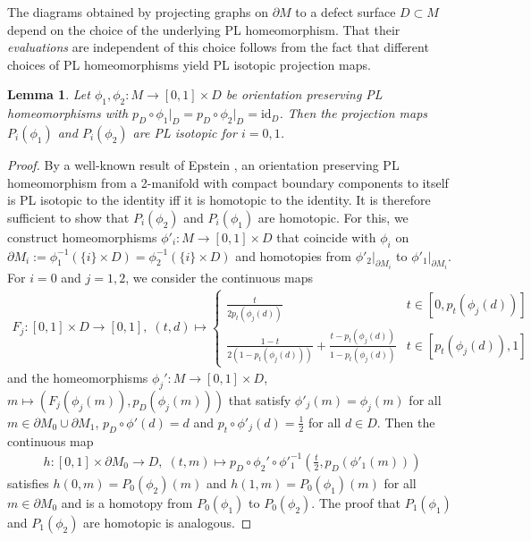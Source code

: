 \documentclass[1.5pt, a4paper]{article}
\newcommand{\inv}[0]{{-1}}
\newtheorem{lemma}[theorem]{Lemma}
\begin{document}
The diagrams obtained by projecting graphs on $\partial M$ to a defect surface $D\subset M$  depend on the choice of the underlying  PL homeomorphism. That their \emph{evaluations} are independent of this choice follows from the fact that different choices of PL homeomorphisms yield PL isotopic projection maps. 


\begin{lemma} \label{lem:projiso}Let $\phi_1,\phi_2: M\to [0,1]\times D$ be orientation preserving PL homeomorphisms with $p_D\circ \phi_1\vert_D=p_D\circ \phi_2\vert_D=\mathrm{id}_D$. Then the projection maps  $P_i(\phi_1)$ and $P_i(\phi_2)$ are PL isotopic for $i=0,1$. 
\end{lemma}

\begin{proof} By a well-known result of Epstein \cite[Th.~6.4]{E}, an orientation preserving PL homeomorphism from a 2-manifold with compact boundary components to itself is  
PL isotopic to the identity iff it is  homotopic to the identity. It is therefore sufficient to show that $P_i(\phi_2)$ and $P_i(\phi_1)$ are homotopic.  For this, we construct homeomorphisms $\phi'_i: M\to [0,1]\times D$ that coincide with $\phi_i$ on $\partial M_i:=\phi_1^\inv(\{i\}\times D)=\phi_2^\inv(\{i\}\times D)$ and  homotopies from $\phi'_2\vert_{\partial M_i}$ to $\phi'_1\vert_{\partial M_i}$.  For $i=0$ and $j=1,2$, we consider the continuous maps
\begin{align*}
F_j:[0,1]\times D\to [0,1], \;(t,d)\mapsto \begin{cases}\frac t {2 p_t(\phi_j(d))} & t\in[0, p_t(\phi_j(d))]\\
\frac {1-t}{2(1-p_t(\phi_j(d)))}+\frac {t-p_t(\phi_j(d))}{1-p_t(\phi_j(d))} & t\in[p_t(\phi_j(d)), 1]
\end{cases}
\end{align*}
and the homeomorphisms
$\phi_j': M\to [0,1]\times D$, $m\mapsto (F_j(\phi_j(m)), p_D(\phi_j(m)))$
that satisfy $\phi'_j(m)=\phi_j(m)$ for all $m\in \partial M_0\cup \partial M_1$, $p_D\circ \phi'(d)=d$ and $p_t\circ \phi'_j(d)=\tfrac 1 2$ for all $d\in D$. Then the continuous map
\begin{align*}
h:[0,1]\times \partial M_0\to D,\; (t,m)\mapsto p_D\circ \phi_2'\circ \phi'^\inv_1(\tfrac t 2 , p_D(\phi'_1(m)))
\end{align*}
satisfies $h(0,m)=P_0(\phi_2)(m)$ and $h(1,m)=P_0(\phi_1)(m)$ for all $m\in \partial M_0$ and is a homotopy from $P_0(\phi_1)$ to $P_0(\phi_2)$.  
The proof that $P_1(\phi_1)$ and $P_1(\phi_2)$ are homotopic is analogous.
\end{proof}
\end{document}
